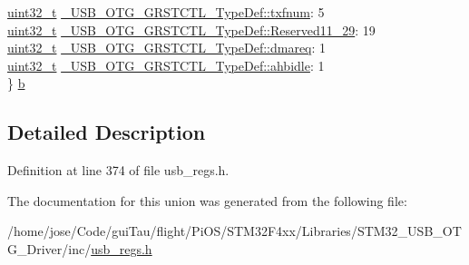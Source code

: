 \begin{DoxyCompactItemize}
\begin{tabbing}
\>\hyperlink{stdint_8h_a435d1572bf3f880d55459d9805097f62}{uint32\_t} \hyperlink{group___u_s_b___o_t_g___d_r_i_v_e_r_gab95417d18c00e88b30adcc7641257683}{\_USB\_OTG\_GRSTCTL\_TypeDef::txfnum}: 5\\
\>\hyperlink{stdint_8h_a435d1572bf3f880d55459d9805097f62}{uint32\_t} \hyperlink{group___u_s_b___o_t_g___d_r_i_v_e_r_gabcbcfe6e19057b32ab213ff12a17af14}{\_USB\_OTG\_GRSTCTL\_TypeDef::Reserved11\_29}: 19\\
\>\hyperlink{stdint_8h_a435d1572bf3f880d55459d9805097f62}{uint32\_t} \hyperlink{group___u_s_b___o_t_g___d_r_i_v_e_r_gad333c8546ac5b74a5a3ef8eb9377268d}{\_USB\_OTG\_GRSTCTL\_TypeDef::dmareq}: 1\\
\>\hyperlink{stdint_8h_a435d1572bf3f880d55459d9805097f62}{uint32\_t} \hyperlink{group___u_s_b___o_t_g___d_r_i_v_e_r_ga4247e798442e482943bbb22ed25cb1eb}{\_USB\_OTG\_GRSTCTL\_TypeDef::ahbidle}: 1\\
\} \hyperlink{group___u_s_b___o_t_g___d_r_i_v_e_r_ga0286fbf0d92a582c87cf8dc71ac1db47}{b}\\

\end{tabbing}\end{DoxyCompactItemize}


\subsection{Detailed Description}


Definition at line 374 of file usb\-\_\-regs.\-h.



The documentation for this union was generated from the following file\-:\begin{DoxyCompactItemize}
\item 
/home/jose/\-Code/gui\-Tau/flight/\-Pi\-O\-S/\-S\-T\-M32\-F4xx/\-Libraries/\-S\-T\-M32\-\_\-\-U\-S\-B\-\_\-\-O\-T\-G\-\_\-\-Driver/inc/\hyperlink{_s_t_m32_f4xx_2_libraries_2_s_t_m32___u_s_b___o_t_g___driver_2inc_2usb__regs_8h}{usb\-\_\-regs.\-h}\end{DoxyCompactItemize}
